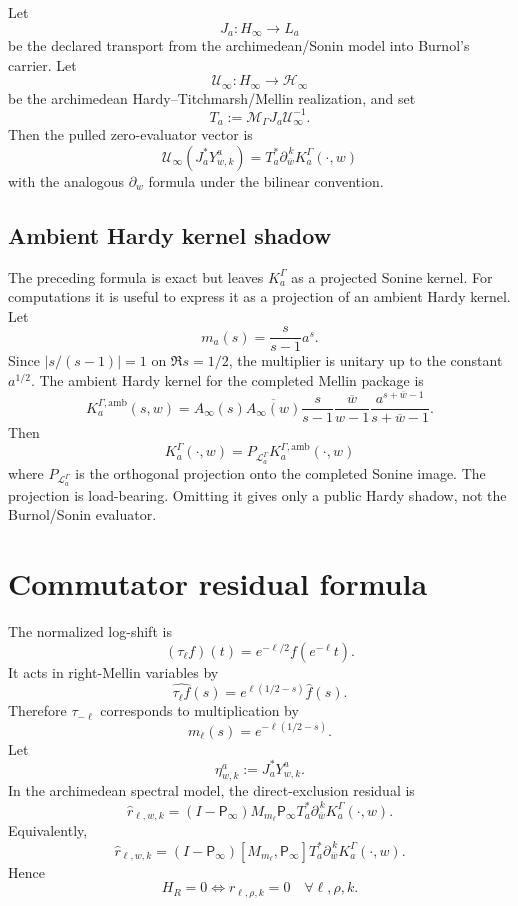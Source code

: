 \documentclass[11pt]{article}
\begin{document}
Let
\[
  J_a:H_\infty\longrightarrow L_a
\]
be the declared transport from the archimedean/Sonin model into Burnol's carrier. Let
\[
  \mathcal U_\infty:H_\infty\to\mathcal H_\infty
\]
be the archimedean Hardy--Titchmarsh/Mellin realization, and set
\[
  T_a:=\mathcal M_\Gamma J_a\mathcal U_\infty^{-1}.
\]
Then the pulled zero-evaluator vector is
\[
  \boxed{
  \mathcal U_\infty(J_a^*Y^a_{w,k})
  =
  T_a^*\partial_{\overline w}^{\,k}K_a^\Gamma(\cdot,w)
  }
\]
with the analogous \(\partial_w\) formula under the bilinear convention.

\subsection{Ambient Hardy kernel shadow}
The preceding formula is exact but leaves \(K_a^\Gamma\) as a projected Sonine kernel. For computations it is useful to express it as a projection of an ambient Hardy kernel.
Let
\[
  m_a(s)=\frac{s}{s-1}a^s.
\]
Since \(|s/(s-1)|=1\) on \(\Re s=1/2\), the multiplier is unitary up to the constant \(a^{1/2}\). The ambient Hardy kernel for the completed Mellin package is
\[
  K^{\Gamma,\mathrm{amb}}_a(s,w)
  =
  A_\infty(s)\overline{A_\infty(w)}
  \frac{s}{s-1}\overline{\frac{w}{w-1}}
  \frac{a^{s+\overline w-1}}{s+\overline w-1}.
\]
Then
\[
  \boxed{
  K_a^\Gamma(\cdot,w)
  =
  P_{\mathcal L_a^\Gamma}K^{\Gamma,\mathrm{amb}}_a(\cdot,w)
  }
\]
where \(P_{\mathcal L_a^\Gamma}\) is the orthogonal projection onto the completed Sonine image.
The projection is load-bearing. Omitting it gives only a public Hardy shadow, not the Burnol/Sonin evaluator.

\section{Commutator residual formula}
The normalized log-shift is
\[
  (\tau_\ell f)(t)=e^{-\ell/2}f(e^{-\ell}t).
\]
It acts in right-Mellin variables by
\[
  \widehat{\tau_\ell f}(s)=e^{\ell(1/2-s)}\widehat f(s).
\]
Therefore \(\tau_{-\ell}\) corresponds to multiplication by
\[
  m_\ell(s)=e^{-\ell(1/2-s)}.
\]
Let
\[
  \eta^a_{w,k}:=J_a^*Y^a_{w,k}.
\]
In the archimedean spectral model, the direct-exclusion residual is
\[
  \boxed{
  \widehat r_{\ell,w,k}
  =
  (I-\mathsf P_\infty)M_{m_\ell}\mathsf P_\infty
  T_a^*\partial_{\overline w}^{\,k}K_a^\Gamma(\cdot,w).
  }
\]
Equivalently,
\[
  \boxed{
  \widehat r_{\ell,w,k}
  =
  (I-\mathsf P_\infty)[M_{m_\ell},\mathsf P_\infty]
  T_a^*\partial_{\overline w}^{\,k}K_a^\Gamma(\cdot,w).
  }
\]
Hence
\[
  \boxed{
  H_R=0
  \iff
  r_{\ell,\rho,k}=0
  \quad\forall\ell,\rho,k.
  }
\]
\end{document}
